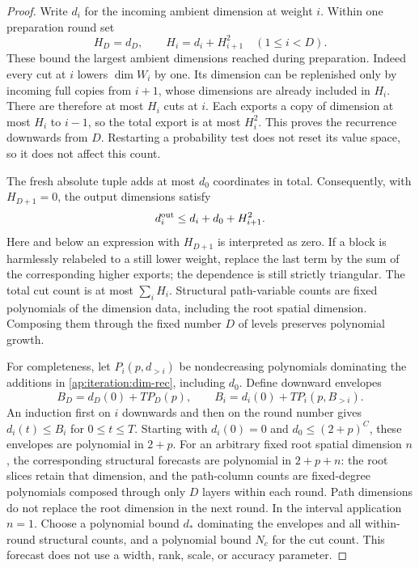 \begin{proof}
Write $d_i$ for the incoming ambient dimension at weight $i$.  Within one
preparation round set
\[
 H_D=d_D,\qquad H_i=d_i+H_{i+1}^{2}\quad(1\le i<D).
\]
These bound the largest ambient dimensions reached during preparation.
Indeed every cut at $i$ lowers $\dim W_i$ by one.  Its dimension can be
replenished only by incoming full copies from $i+1$, whose dimensions are
already included in $H_i$.  There are therefore at most $H_i$ cuts at $i$.
Each exports a copy of dimension at most $H_i$ to $i-1$, so the total export
is at most $H_i^2$.  This proves the recurrence downwards from $D$.
Restarting a probability test does not reset its value space, so it does
not affect this count.

The fresh absolute tuple adds at most $d_0$ coordinates in total.
Consequently, with $H_{D+1}=0$, the output dimensions satisfy
\begin{equation}\label{ap:iteration:dim-rec}
 d_i^{\rm out}\le d_i+d_0+H_{i+1}^{2}.
\end{equation}
Here and below an expression with $H_{D+1}$ is interpreted as zero.  If a
block is harmlessly relabeled to a still lower weight, replace the last
term by the sum of the corresponding higher exports; the dependence is
still strictly triangular.  The total cut count is at most
$\sum_i H_i$.  Structural path-variable counts are fixed polynomials of
the dimension data, including the root spatial dimension.  Composing
them through the fixed number $D$ of levels preserves polynomial growth.

For completeness, let $P_i(p,d_{>i})$ be nondecreasing polynomials
dominating the additions in \eqref{ap:iteration:dim-rec}, including $d_0$.
Define downward envelopes
\[
 B_D=d_D(0)+T P_D(p),\qquad
 B_i=d_i(0)+T P_i(p,B_{>i}).
\]
An induction first on $i$ downwards and then on the round number gives
$d_i(t)\le B_i$ for $0\le t\le T$.  Starting with $d_i(0)=0$ and
$d_0\le(2+p)^C$, these envelopes are polynomial in $2+p$.
For an arbitrary fixed root spatial dimension $n$, the corresponding
structural forecasts are polynomial in $2+p+n$: the root slices retain
that dimension, and the path-column counts are fixed-degree polynomials
composed through only $D$ layers within each round.  Path dimensions do
not replace the root dimension in the next round.
In the interval application $n=1$.  Choose a polynomial bound $d_*$
dominating the envelopes and all within-round structural counts, and a
polynomial bound $N_c$ for the cut count.  This forecast does not use a
width, rank, scale, or accuracy parameter.
\end{proof}

